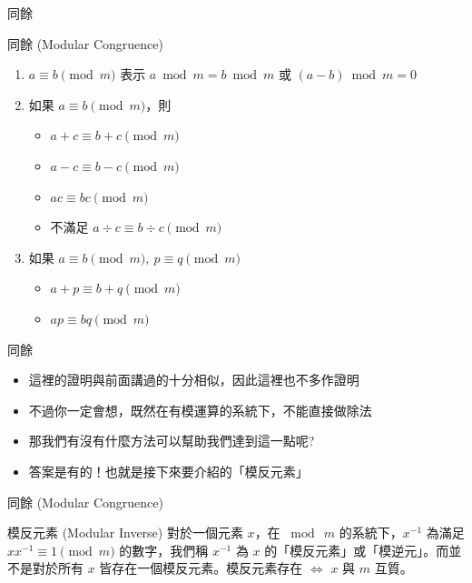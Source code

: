 \documentclass[aspectratio=169]{beamer}
\begin{document}
    \begin{frame}{同餘}
        \begin{block}{同餘 (Modular Congruence)}
            \begin{enumerate}
                \item $a \equiv b \pmod m$ 表示 $a \bmod m = b \bmod m$ 或 $(a-b) \bmod m = 0$
                \item 如果 $a \equiv b \pmod m$，則
                    \begin{itemize}
                        \item $a+c \equiv b+c \pmod m$
                        \item $a-c \equiv b-c \pmod m$
                        \item $ac \equiv bc \pmod m$
                        \item 不滿足 $a \div c \equiv b \div c \pmod m$
                    \end{itemize}
                \item 如果 $a \equiv b \pmod m, \ p \equiv q \pmod m$
                \begin{itemize}
                    \item $a+p \equiv b+q \pmod m$
                    \item $ap \equiv bq \pmod m$
                \end{itemize}
            \end{enumerate}
        \end{block}
    \end{frame}
    
    \begin{frame}{同餘}
        \begin{itemize}
            \item 這裡的證明與前面講過的十分相似，因此這裡也不多作證明
            \item 不過你一定會想，既然在有模運算的系統下，不能直接做除法
            \item 那我們有沒有什麼方法可以幫助我們達到這一點呢?
            \item 答案是有的！也就是接下來要介紹的「模反元素」
        \end{itemize}
    \end{frame}
    
    \begin{frame}{同餘 (Modular Congruence)}
        \begin{block}{模反元素 (Modular Inverse)}
            對於一個元素 $x$，在 $\bmod \ m$ 的系統下，$x^{-1}$ 為滿足 $xx^{-1}\equiv 1 \pmod m$ 的數字，我們稱 $x^{-1}$ 為 $x$ 的「模反元素」或「模逆元」。而並不是對於所有 $x$ 皆存在一個模反元素。模反元素存在 $\iff$ $x$ 與 $m$ 互質。
        \end{block}
    \end{frame}
    
\end{document}
